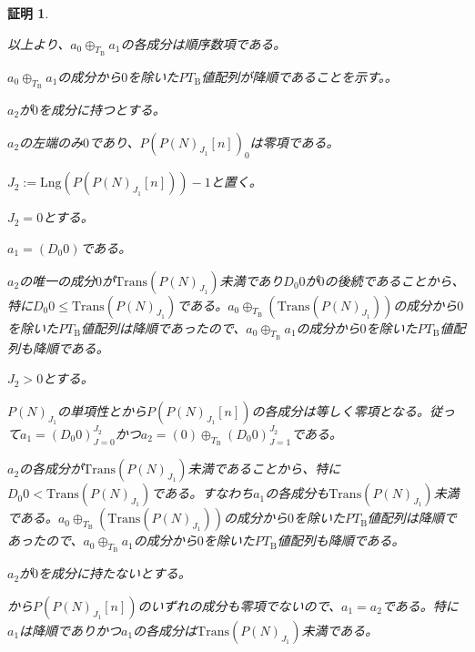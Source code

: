 \documentclass[dvipdfmx,uplatex]{jsarticle}
\theoremstyle{customnonumberbreakfortheorem}
\theoremstyle{customnonumberbreakforproof}
\newtheorem{hideableproof}{証明}
\begin{document}
\begin{hideableproof}
\begin{indented}
\begin{indented}
\begin{indented}
				\item 以上より、\(a_0 \oplus_{T_{\textrm{B}}} a_1\)の各成分は順序数項である。
				\item
				\item \(a_0 \oplus_{T_{\textrm{B}}} a_1\)の成分から\(0\)を除いた\(PT_{\textrm{B}}\)値配列が降順であることを示す。。
				\item \(a_2\)が\(0\)を成分に持つとする。
				\begin{indented}
					\item \(a_2\)の左端のみ\(0\)であり、\(P(P(N)_{J_1}[n])_0\)は零項である。
					\item \(J_2 := \textrm{Lng}(P(P(N)_{J_1}[n]))-1\)と置く。
					\item \(J_2 = 0\)とする。
					\begin{indented}
						\item \(a_1 = (D_0 0)\)である。
						\item \(a_2\)の唯一の成分\(0\)が\(\textrm{Trans}(P(N)_{J_1})\)未満であり\(D_0 0\)が\(0\)の後続であることから、特に\(D_0 0 \leq \textrm{Trans}(P(N)_{J_1})\)である。\(a_0 \oplus_{T_{\textrm{B}}} (\textrm{Trans}(P(N)_{J_1}))\)の成分から\(0\)を除いた\(PT_{\textrm{B}}\)値配列は降順であったので、\(a_0 \oplus_{T_{\textrm{B}}} a_1\)の成分から\(0\)を除いた\(PT_{\textrm{B}}\)値配列も降順である。
					\end{indented}
					\item \(J_2 > 0\)とする。
					\begin{indented}
						\item \(P(N)_{J_1}\)の単項性とから\(P(P(N)_{J_1}[n])\)の各成分は等しく零項となる。従って\(a_1 = (D_0 0)_{J=0}^{J_2}\)かつ\(a_2 = (0) \oplus_{T_{\textrm{B}}} (D_0 0)_{J=1}^{J_2}\)である。
						\item \(a_2\)の各成分が\(\textrm{Trans}(P(N)_{J_1})\)未満であることから、特に\(D_0 0 < \textrm{Trans}(P(N)_{J_1})\)である。すなわち\(a_1\)の各成分も\(\textrm{Trans}(P(N)_{J_1})\)未満である。\(a_0 \oplus_{T_{\textrm{B}}} (\textrm{Trans}(P(N)_{J_1}))\)の成分から\(0\)を除いた\(PT_{\textrm{B}}\)値配列は降順であったので、\(a_0 \oplus_{T_{\textrm{B}}} a_1\)の成分から\(0\)を除いた\(PT_{\textrm{B}}\)値配列も降順である。
					\end{indented}
				\end{indented}
				\item \(a_2\)が\(0\)を成分に持たないとする。
				\begin{indented}
					\item {}から\(P(P(N)_{J_1}[n])\)のいずれの成分も零項でないので、\(a_1 = a_2\)である。特に\(a_1\)は降順でありかつ\(a_1\)の各成分は\(\textrm{Trans}(P(N)_{J_1})\)未満である。

\end{indented}
\end{indented}
\end{indented}
\end{indented}
\end{hideableproof}
\end{document}
